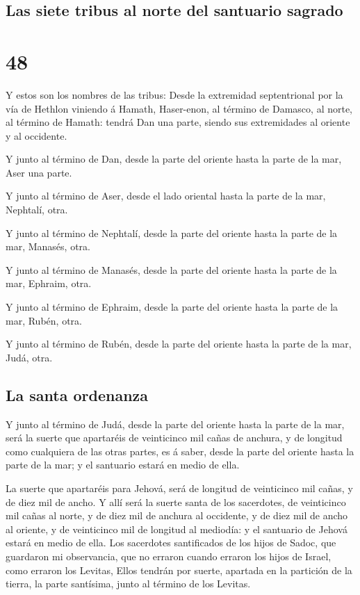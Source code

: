 \hypertarget{las-siete-tribus-al-norte-del-santuario-sagrado}{%
\subsection{Las siete tribus al norte del santuario
sagrado}\label{las-siete-tribus-al-norte-del-santuario-sagrado}}

\hypertarget{section-47}{%
\section{48}\label{section-47}}

 Y estos son los nombres de las tribus: Desde la extremidad
septentrional por la vía de Hethlon viniendo á Hamath, Haser-enon, al
término de Damasco, al norte, al término de Hamath: tendrá Dan una
parte, siendo sus extremidades al oriente y al occidente.

 Y junto al término de Dan, desde la parte del oriente hasta
la parte de la mar, Aser una parte.

 Y junto al término de Aser, desde el lado oriental hasta la
parte de la mar, Nephtalí, otra.

 Y junto al término de Nephtalí, desde la parte del oriente
hasta la parte de la mar, Manasés, otra.

 Y junto al término de Manasés, desde la parte del oriente
hasta la parte de la mar, Ephraim, otra.

 Y junto al término de Ephraim, desde la parte del oriente
hasta la parte de la mar, Rubén, otra.

 Y junto al término de Rubén, desde la parte del oriente
hasta la parte de la mar, Judá, otra.

\hypertarget{la-santa-ordenanza}{%
\subsection{La santa ordenanza}\label{la-santa-ordenanza}}

 Y junto al término de Judá, desde la parte del oriente
hasta la parte de la mar, será la suerte que apartaréis de veinticinco
mil cañas de anchura, y de longitud como cualquiera de las otras partes,
es á saber, desde la parte del oriente hasta la parte de la mar; y el
santuario estará en medio de ella.

 La suerte que apartaréis para Jehová, será de longitud de
veinticinco mil cañas, y de diez mil de ancho.  Y allí será
la suerte santa de los sacerdotes, de veinticinco mil cañas al norte, y
de diez mil de anchura al occidente, y de diez mil de ancho al oriente,
y de veinticinco mil de longitud al mediodía: y el santuario de Jehová
estará en medio de ella.  Los sacerdotes santificados de
los hijos de Sadoc, que guardaron mi observancia, que no erraron cuando
erraron los hijos de Israel, como erraron los Levitas, 
Ellos tendrán por suerte, apartada en la partición de la tierra, la
parte santísima, junto al término de los Levitas.

